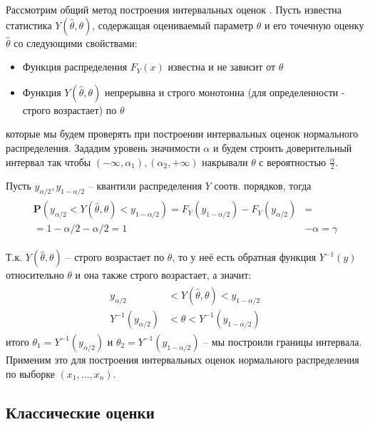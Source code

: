 \documentclass[12pt,a4paper]{article}
\begin{document}
\label{method}
Рассмотрим общий метод построения интервальных оценок \cite[стр. 456- -- 457]{verrazdely}. Пусть известна статистика $Y(\widehat{\theta}, \theta)$, содержащая оцениваемый параметр $\theta$ и его точечную оценку $\widehat{\theta}$ со следующими свойствами:
\begin{itemize}
	\item Функция распределения $F_Y (x)$ известна и не зависит от $\theta$
	\item Функция $Y (\widehat{\theta}, \theta)$ непрерывна и строго монотонна (для определенности - строго возрастает) по $\theta$
\end{itemize}
которые мы будем проверять при построении интервальных оценок нормального распределения. Зададим уровень значимости $\alpha$ и будем строить доверительный интервал так чтобы $(-\infty, \alpha_1), (\alpha_2, +\infty)$ накрывали $\theta$ с вероятностью $\frac{\alpha}{2}$. 

Пусть $y_{\alpha / 2}, y_{1 - \alpha / 2}$ -- квантили распределения $Y$ соотв. порядков, тогда
\begin{align}
\begin{split}
\textbf{P}\left(y_{\alpha / 2}<Y(\widehat{\theta}, \theta)<y_{1 - \alpha / 2}\right)=F_{Y}\left(y_{1-\alpha / 2}\right)-F_{Y}\left(y_{\alpha / 2}\right) &=\\
=1-\alpha / 2-\alpha / 2=1 &-\alpha=\gamma
\end{split}
\end{align}

Т.к. $Y(\widehat{\theta}, \theta)$ -- строго возрастает по $\theta$, то у неё есть обратная функция $Y^{-1}(y)$ относительно $\theta$ и она также строго возрастает, а значит:
\begin{align}
\begin{split}
y_{\alpha / 2} &< Y(\widehat{\theta}, \theta) < y_{1 - \alpha / 2} \\
Y^{-1}(y_{\alpha / 2}) &< \theta < Y^{-1}(y_{1 - \alpha / 2})
\end{split}
\end{align}
итого $\theta_1 = Y^{-1}(y_{\alpha / 2})$ и $\theta_2 = Y^{-1}(y_{1 - \alpha / 2})$ -- мы построили границы интервала. Применим это для построения интервальных оценок нормального распределения по выборке $(x_1, ..., x_n)$.

\subsection{Классические оценки}
\end{document}

